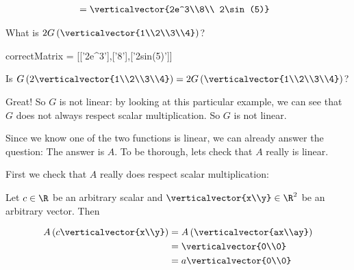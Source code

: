 \documentclass{ximera}
\begin{document}
\begin{question}
\begin{solution}
\begin{hint}
\begin{question}
\begin{solution}
\begin{hint}
\begin{align*}
					&=\verticalvector{2e^3\\8\\ 2\sin(5)}
			\end{align*}
		\end{hint}
        	 What is $2G\left(\verticalvector{1\\2\\3\\4}\right)$?
        	 \begin{matrix-answer}[name=v]
    			  correctMatrix = [['2e^3'],['8'],['2sin(5)']]
        	 \end{matrix-answer}
        	\end{solution}
        	\begin{solution}
        		Is $G\left( 2\verticalvector{1\\2\\3\\4}\right) =  2G\left(\verticalvector{1\\2\\3\\4}\right)$?
        		\begin{multiple-choice}
        		\end{multiple-choice}
        	\end{solution}
        	
        	Great!  So $G$ is not linear:  by looking at this particular example, we can see that $G$ does not always respect scalar multiplication.  So $G$ is not linear.
		
        	Since we know one of the two functions is linear, we can already answer the question:  The answer is $A$.  To be thorough, lets check that $A$ really is linear.
		
        	First we check that $A$ really does respect scalar multiplication:
		
        	Let $c \in \R$ be an arbitrary scalar and $\verticalvector{x\\y} \in \R^2$ be an arbitrary vector.  Then
		
        	\begin{align*}
        	 A\left(c\verticalvector{x\\y}\right) &= A\left( \verticalvector{ax\\ay}\right)\\
        	 	&=\verticalvector{0\\0}\\
        	 	&=a\verticalvector{0\\0}
        	 \end{align*}
		 

\end{question}
\end{hint}
\end{solution}
\end{question}
\end{document}
